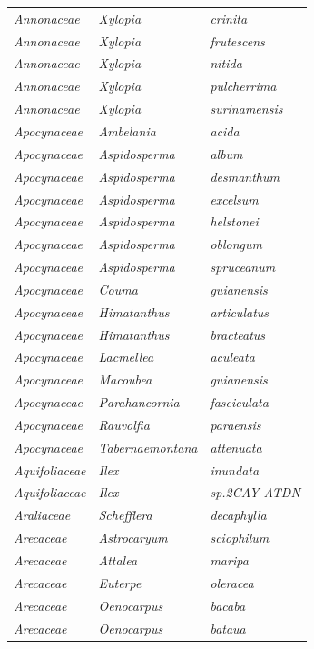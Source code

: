 \documentclass[fleqn,10pt]{ArtEcoFoG} %
\begin{document}
\begin{table}[t]
\begin{tabular}{lll}
\em{Annonaceae} & \em{Xylopia} & \em{crinita}\\
\addlinespace
\em{Annonaceae} & \em{Xylopia} & \em{frutescens}\\
\em{Annonaceae} & \em{Xylopia} & \em{nitida}\\
\em{Annonaceae} & \em{Xylopia} & \em{pulcherrima}\\
\em{Annonaceae} & \em{Xylopia} & \em{surinamensis}\\
\em{Apocynaceae} & \em{Ambelania} & \em{acida}\\
\addlinespace
\em{Apocynaceae} & \em{Aspidosperma} & \em{album}\\
\em{Apocynaceae} & \em{Aspidosperma} & \em{desmanthum}\\
\em{Apocynaceae} & \em{Aspidosperma} & \em{excelsum}\\
\em{Apocynaceae} & \em{Aspidosperma} & \em{helstonei}\\
\em{Apocynaceae} & \em{Aspidosperma} & \em{oblongum}\\
\addlinespace
\em{Apocynaceae} & \em{Aspidosperma} & \em{spruceanum}\\
\em{Apocynaceae} & \em{Couma} & \em{guianensis}\\
\em{Apocynaceae} & \em{Himatanthus} & \em{articulatus}\\
\em{Apocynaceae} & \em{Himatanthus} & \em{bracteatus}\\
\em{Apocynaceae} & \em{Lacmellea} & \em{aculeata}\\
\addlinespace
\em{Apocynaceae} & \em{Macoubea} & \em{guianensis}\\
\em{Apocynaceae} & \em{Parahancornia} & \em{fasciculata}\\
\em{Apocynaceae} & \em{Rauvolfia} & \em{paraensis}\\
\em{Apocynaceae} & \em{Tabernaemontana} & \em{attenuata}\\
\em{Aquifoliaceae} & \em{Ilex} & \em{inundata}\\
\addlinespace
\em{Aquifoliaceae} & \em{Ilex} & \em{sp.2CAY-ATDN}\\
\em{Araliaceae} & \em{Schefflera} & \em{decaphylla}\\
\em{Arecaceae} & \em{Astrocaryum} & \em{sciophilum}\\
\em{Arecaceae} & \em{Attalea} & \em{maripa}\\
\em{Arecaceae} & \em{Euterpe} & \em{oleracea}\\
\addlinespace
\em{Arecaceae} & \em{Oenocarpus} & \em{bacaba}\\
\em{Arecaceae} & \em{Oenocarpus} & \em{bataua}\\

\end{tabular}
\end{table}
\end{document}
